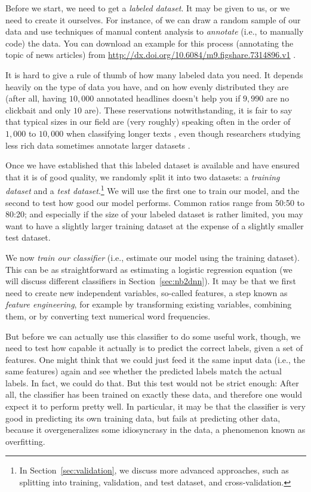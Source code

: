 Before we start, we need to get a \emph{labeled dataset}.
It may be given to us, or we need to create it ourselves.
For instance, of we can draw a random sample of our data and use techniques
of manual content analysis \citep[e.g.,][]{riffe2019analyzing} to
\emph{annotate} (i.e., to manually code) the data.
You can download an example for this process (annotating the topic of news
articles) from \url{http://dx.doi.org/10.6084/m9.figshare.7314896.v1} \citep{Vermeer}.

It is hard to give a rule of thumb of how many labeled data you need.
It depends heavily on the type of data you have, and on how evenly distributed
they are (after all, having $10,000$ annotated headlines doesn't help you if
$9,990$ are no clickbait and only $10$ are).
These reservations notwithstanding, it is fair to say that typical sizes in
our field are (very roughly) speaking often in the order of $1,000$ to $10,000$
when classifying longer texts \citep[see, for instance,][]{burscher2014teaching},
even though researchers studying less rich data sometimes annotate larger
datasets \citep[e.g., $60,000$ social media messages in][]{vermeer2019seeing}.

Once we have established that this labeled dataset is available and have
ensured that it is of good quality, we randomly split it into two datasets:
a \emph{training dataset} and a \emph{test dataset}.\footnote{In
  Section~\ref{sec:validation}, we discuss more advanced approaches, such
  as splitting into training, validation, and test dataset, and cross-validation.}
We will use the first one to train our model, and the second to test how
good our model performs. Common ratios range from 50:50 to 80:20; and especially
if the size of your labeled dataset is rather limited, you may want to have
a slightly larger training dataset at the expense of a slightly smaller test
dataset.

We now \emph{train our classifier} (i.e., estimate our model using the
training dataset). This can be as straightforward as estimating a logistic
regression equation (we will discuss different classifiers in
Section~\ref{sec:nb2dnn}).
It may be that we first need to create new independent variables, so-called
features, a step known as \emph{feature engineering}, for example by transforming
existing variables, combining them, or by converting text numerical word frequencies.

But before we can actually use this classifier to do some useful work, though,
we need to test how capable it actually is to predict the correct labels,
given a set of features. One might think that we could just feed it the same
input data (i.e., the same features) again and see whether the predicted labels
match the actual labels.
In fact, we could do that.
But this test would not be strict enough:
After all, the classifier has been trained on exactly these data, and therefore
one would expect it to perform pretty well.
In particular, it may be that the classifier is very good in predicting its
own training data, but fails at predicting other data, because it overgeneralizes
some idiosyncrasy in the data, a phenomenon known as overfitting.

